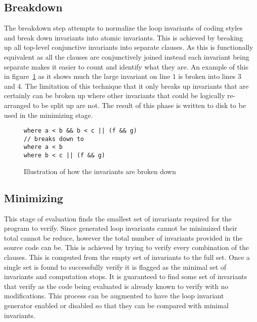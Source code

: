 \subsection{Breakdown}

The breakdown step attempts to normalize the loop invariants of coding styles
and break down invariants into atomic invariants.
This is achieved by breaking up all top-level conjunctive invariants into
separate  clauses.
As this is functionally equivalent as all the  clauses are
conjunctively joined instead each invariant being separate makes it easier to count
and identify what they are.
An example of this in figure~\ref{lst:breakdown} as it shows much the large
invariant on line 1 is broken into lines 3 and 4.
The limitation of this technique that it only breaks up invariants that are
certainly can be broken up where other invariants that could be logically
re-arranged to be split up are not.
The result of this phase is written to disk to be used in the minimizing stage.

\begin{figure}[ht]
\begin{lstlisting}
where a < b && b < c || (f && g)
// breaks down to
where a < b
where b < c || (f && g)
\end{lstlisting}
\caption{Illustration of how the invariants are broken down}
\label{lst:breakdown}
\end{figure}


\subsection{Minimizing}

This stage of evaluation finds the smallest set of invariants
required for the program to verify.
Since generated loop invariants cannot be minimized their total cannot be
reduce, however the total number of invariants provided in the source code can
be.
This is achieved by trying to verify every combination of the  clauses.
This is computed from the empty set of invariants to the full set.
Once a single set is found to successfully verify it is flagged as the minimal
set of invariants and computation stops.
It is guaranteed to find some set of invariants that verify as the code being
evaluated is already known to verify with no modifications.
This process can be augmented to have the loop invariant generator enabled or
disabled so that they can be compared with minimal invariants.

